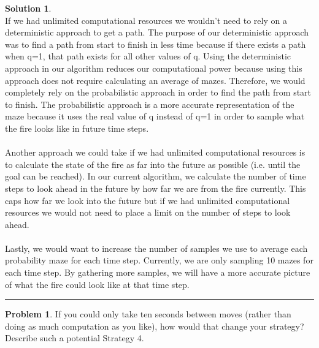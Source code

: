 \documentclass{article}
\theoremstyle{definition}
\newtheorem{problem}{Problem}
\def\fline{\rule{0.75\linewidth}{0.5pt}}
\newcommand{\finishline}{\vspace{-15pt}\begin{center}\fline\end{center}}
\newtheorem*{solution*}{Solution}
\newenvironment{solution}{\begin{solution*}}{{\finishline} \end{solution*}}
\begin{document}
\begin{solution} \hfill \\
	If we had unlimited computational resources we wouldn't need to rely on a deterministic approach to get a path. The purpose of our deterministic approach was to find a path from start to finish in less time because if there exists a path when q=1, that path exists for all other values of q. Using the deterministic approach in our algorithm reduces our computational power because using this approach does not require calculating an average of mazes. Therefore, we would completely rely on the probabilistic approach in order to find the path from start to finish. The probabilistic approach is a more accurate representation of the maze because it uses the real value of q instead of q=1 in order to sample what the fire looks like in future time steps. \\ \\
	Another approach we could take if we had unlimited computational resources is to calculate the state of the fire as far into the future as possible (i.e. until the goal can be reached). In our current algorithm, we calculate the number of time steps to look ahead in the future by how far we are from the fire currently. This caps how far we look into the future but if we had unlimited computational resources we would not need to place a limit on the number of steps to look ahead. \\ \\
    Lastly, we would want to increase the number of samples we use to average each probability maze for each time step. Currently, we are only sampling 10 mazes for each time step. By gathering more samples, we will have a more accurate picture of what the fire could look like at that time step. \\
\end{solution}

\smallskip

\begin{problem}
	If you could only take ten seconds between moves (rather than doing as much computation as you like), how would that change your strategy? Describe such a potential Strategy 4.
\end{problem}

\smallskip
\end{document}
